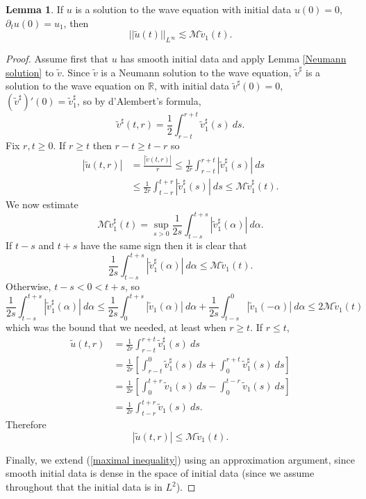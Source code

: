 \documentclass[10pt]{article}
\newcommand{\RR}{\mathbb{R}}
\theoremstyle{definition}
\newtheorem{lemma}{Lemma}[exer]
\begin{document}
\begin{lemma}
If $u$ is a solution to the wave equation with initial data $u(0) = 0$, $\partial_t u(0) = u_1$, then
\begin{equation}
\label{maximal inequality}
||\tilde u(t)||_{L^\infty} \lesssim \mathcal M\tilde v_1(t).
\end{equation}
\end{lemma}
\begin{proof}
Assume first that $u$ has smooth initial data and apply Lemma \ref{Neumann solution} to $\tilde v$.
Since $\tilde v$ is a Neumann solution to the wave equation, $\tilde v^\sharp$ is a solution to the wave equation on $\RR$, with initial data $\tilde v^\sharp(0) = 0$, $(\tilde v^\sharp)'(0) = \tilde v_1^\sharp$, so by d'Alembert's formula,
$$\tilde v^\sharp(t, r) = \frac{1}{2} \int_{r - t}^{r + t} \tilde v_1^\sharp(s) ~ds.$$
Fix $r, t \geq 0$. If $r \geq t$ then $r - t \geq t - r$ so
\begin{align*}
|\tilde u(t, r)| &= \frac{|\tilde v(t, r)|}{r} \leq \frac{1}{2r} \int_{r - t}^{r + t} |\tilde v_1^\sharp(s)|~ds\\
&\leq \frac{1}{2r} \int_{t - r}^{t + r} |\tilde v_1^\sharp(s)| ~ds \leq \mathcal M\tilde v_1^\sharp(t).
\end{align*}
We now estimate
$$\mathcal M\tilde v_1^\sharp(t) = \sup_{s > 0} \frac{1}{2s} \int_{t - s}^{t + s} |\tilde v_1^\sharp(\alpha)| ~d\alpha.$$
If $t - s$ and $t + s$ have the same sign then it is clear that
$$\frac{1}{2s} \int_{t - s}^{t + s} |\tilde v_1^\sharp(\alpha)| ~d\alpha \leq \mathcal M\tilde v_1(t).$$
Otherwise, $t - s < 0 < t + s$, so
$$\frac{1}{2s} \int_{t - s}^{t + s} |\tilde v_1^\sharp(\alpha)| ~d\alpha \leq \frac{1}{2s} \int_0^{t + s} |\tilde v_1(\alpha)| ~d\alpha + \frac{1}{2s} \int_{t - s}^0 |\tilde v_1(-\alpha)|~d\alpha \leq 2\mathcal M\tilde v_1(t)$$
which was the bound that we needed, at least when $r \geq t$.
If $r \leq t$,
\begin{align*}
\tilde u(t, r) &= \frac{1}{2r} \int_{r - t}^{r + t} \tilde v_1^\sharp(s) ~ds \\
&= \frac{1}{2r} \left[\int_{r - t}^0 \tilde v_1^\sharp(s) ~ds + \int_0^{r + t} \tilde v_1^\sharp(s) ~ds \right]\\
&= \frac{1}{2r} \left[\int_0^{t + r} \tilde v_1(s) ~ds - \int_0^{t - r} \tilde v_1(s) ~ds\right]\\
&= \frac{1}{2r} \int_{t - r}^{t + r} \tilde v_1(s) ~ds.
\end{align*}
Therefore
$$|\tilde u(t, r)| \leq \mathcal M\tilde v_1(t).$$

Finally, we extend (\ref{maximal inequality}) using an approximation argument, since smooth initial data is dense in the space of initial data (since we assume throughout that the initial data is in $L^2$).
\end{proof}
\end{document}
